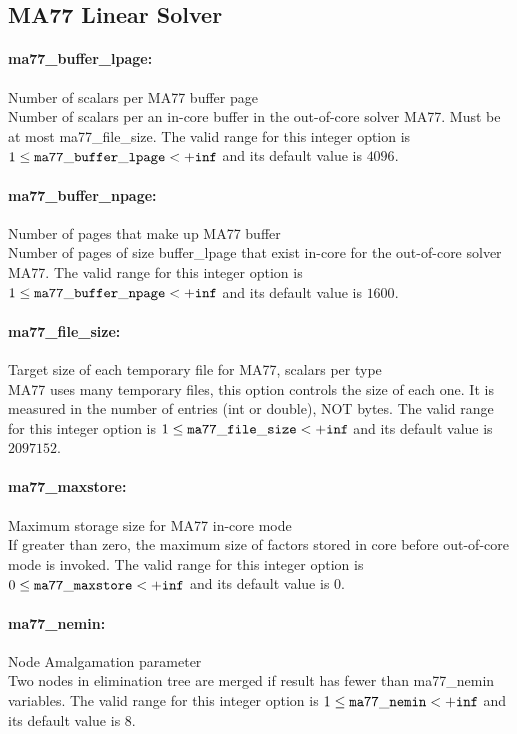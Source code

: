 \subsection{MA77 Linear Solver}
\label{sec:MA77LinearSolver}
\paragraph{ma77\_buffer\_lpage:}\label{opt:ma77_buffer_lpage} Number of scalars per MA77 buffer page \\
 Number of scalars per an in-core buffer in the out-of-core solver MA77. Must be at most ma77\_file\_size. The valid range for this integer option is
$1 \le {\tt ma77\_buffer\_lpage } <  {\tt +inf}$
and its default value is $4096$.


\paragraph{ma77\_buffer\_npage:}\label{opt:ma77_buffer_npage} Number of pages that make up MA77 buffer \\
 Number of pages of size buffer\_lpage that exist in-core for the out-of-core solver MA77. The valid range for this integer option is
$1 \le {\tt ma77\_buffer\_npage } <  {\tt +inf}$
and its default value is $1600$.


\paragraph{ma77\_file\_size:}\label{opt:ma77_file_size} Target size of each temporary file for MA77, scalars per type \\
 MA77 uses many temporary files, this option controls the size of each one. It is measured in the number of entries (int or double), NOT bytes. The valid range for this integer option is
$1 \le {\tt ma77\_file\_size } <  {\tt +inf}$
and its default value is $2097152$.


\paragraph{ma77\_maxstore:}\label{opt:ma77_maxstore} Maximum storage size for MA77 in-core mode \\
 If greater than zero, the maximum size of factors stored in core before out-of-core mode is invoked. The valid range for this integer option is
$0 \le {\tt ma77\_maxstore } <  {\tt +inf}$
and its default value is $0$.


\paragraph{ma77\_nemin:}\label{opt:ma77_nemin} Node Amalgamation parameter \\
 Two nodes in elimination tree are merged if result has fewer than ma77\_nemin variables. The valid range for this integer option is
$1 \le {\tt ma77\_nemin } <  {\tt +inf}$
and its default value is $8$.


